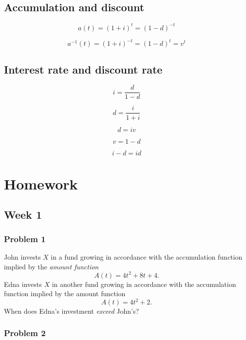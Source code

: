 \documentclass[
]{book}
\begin{document}
\hypertarget{accumulation-and-discount}{%
\subsection*{Accumulation and discount}\label{accumulation-and-discount}}

\[a(t)=(1+i)^t=(1-d)^{-t}\]

\[a^{-1}(t)=(1+i)^{-t}=(1-d)^t=v^t\]

\hypertarget{interest-rate-and-discount-rate}{%
\subsection*{Interest rate and discount rate}\label{interest-rate-and-discount-rate}}

\[i=\frac{d}{1-d}\]

\[d=\frac{i}{1+i}\]

\[d=iv\]

\[v=1-d\]

\[i-d=id\]

\hypertarget{homework}{%
\section{Homework}\label{homework}}

\hypertarget{week-1}{%
\subsection*{Week 1}\label{week-1}}

\hypertarget{problem-1}{%
\subsubsection*{Problem 1}\label{problem-1}}

John invests \(X\) in a fund growing in accordance with the accumulation function implied by the \emph{amount function}
\[A(t)=4t^2+8t+4.\]
Edna invests \(X\) in another fund growing in accordance with the accumulation function implied by the amount function \[A(t)=4t^2+2.\]
When does Edna's investment \emph{exceed} John's?

\hypertarget{problem-2}{%
\subsubsection*{Problem 2}\label{problem-2}}
\end{document}
